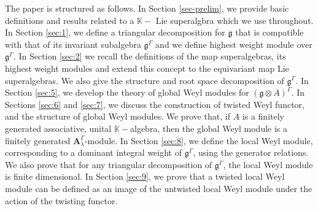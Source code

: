 \documentclass[11pt]{amsart}
\theoremstyle{plain}
\theoremstyle{definition}
\newcommand{\g}{\mathfrak{g}}
\newcommand{\A}{\mathbf{A}_{\lambda}^{\Gamma}}
\begin{document}
 The paper is structured as follows. In Section \ref{sec-prelim}, we provide basic definitions and results related to a $\mathbb{K}-$ Lie superalgbra which we use throughout. In Section \ref{sec:1}, we  define a triangular decomposition for $\g$ that is compatible with that of its invariant subalgebra $\g^{\Gamma}$ and we define highest weight module over $\g^{\Gamma}$. In Section \ref{sec:2} we recall the definitions of the map superalgebras, its highest weight modules and extend this concept to the equivariant map Lie superalgebras. We also give the structure and root space decomposition of $\g^{\Gamma}$.
 In Section \ref{sec:5}, we develop the theory of global Weyl modules for $(\g\otimes A)^{\Gamma}$. In Sections \ref{sec:6} and \ref{sec:7}, we discuss the construction of twisted Weyl functor, and the structure of global Weyl modules. We prove that, if $A$ is a finitely generated associative, unital $\mathbb{K}-$algebra, then the global Weyl module is a finitely generated $\A$-module. In Section \ref{sec:8}, we define the local Weyl module, corresponding to a dominant integral weight of $\g^{\Gamma}$, using the generator relations. We also prove that for any triangular decomposition of $\g^{\Gamma}$, the local Weyl module is finite dimensional. 
 In Section \ref{sec:9}, we prove that a twisted local Weyl module can be defined as an image of the untwisted local Weyl module under the action of the twisting functor. 
\end{document}
